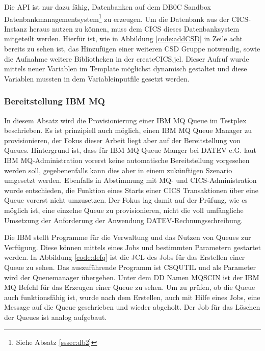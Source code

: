 Die API ist nur dazu fähig, Datenbanken auf dem DB0C Sandbox Datenbankmanagementsystem\footnote{Siehe Absatz \ref{sssec:db2}} zu erzeugen.
Um die Datenbank aus der CICS-Instanz heraus nutzen zu können, muss dem CICS dieses Datenbanksystem mitgeteilt werden.
Hierfür ist, wie in Abbildung \ref{code:addCSD} in Zeile acht bereits zu sehen ist, das Hinzufügen einer weiteren CSD Gruppe notwendig, sowie die Aufnahme weitere Bibliotheken in der \glqq createCICS.jcl\grqq.
Dieser Aufruf wurde mittels neuer Variablen im Template möglichst dynamisch gestaltet und diese Variablen mussten in dem Variableinputfile gesetzt werden.

\subsubsection{Bereitstellung IBM MQ}\label{sssec:mqtplx}
In diesem Absatz wird die Provisionierung einer IBM MQ Queue im Testplex beschrieben. 
Es ist prinzipiell auch möglich, einen IBM MQ Queue Manager zu provisionieren, der Fokus dieser Arbeit liegt aber auf der Bereitstellung von Queues. 
Hintergrund ist, dass für  IBM MQ Queue Manger bei DATEV e.G.  laut IBM MQ-Administration vorerst keine automatische Bereitstellung vorgesehen werden soll, gegebenenfalls kann dies aber in einem zukünftigen Szenario umgesetzt werden.
Ebenfalls in Abstimmung mit MQ- und CICS-Administration wurde entschieden, die Funktion eines Starts einer CICS Transaktionen über eine Queue vorerst nicht umzusetzen. Der Fokus lag damit auf der Prüfung, wie es möglich ist, eine einzelne Queue zu provisionieren, nicht die voll umfängliche Umsetzung der Anforderung der Anwendung DATEV-Rechnungsschreibung. 

Die IBM stellt Programme für die Verwaltung und das Nutzen von Queues  zur Verfügung.
Diese können mittels eines Jobs und bestimmten Parametern gestartet werden.
In Abbildung \ref{code:defq} ist die JCL des Jobs für das Erstellen einer Queue zu sehen.
Das auszuführende Programm ist \glqq CSQUTIL\grqq{} und als Parameter wird der Queuemanager übergeben.
Unter dem DD Namen \glqq MQSCIN\grqq{} ist der IBM MQ Befehl für das Erzeugen einer Queue zu sehen.
Um zu prüfen, ob die Queue auch funktionsfähig ist, wurde nach dem Erstellen, auch mit Hilfe eines Jobs, eine Message auf die Queue geschrieben und wieder abgeholt.
Der Job für das Löschen der Queues ist analog aufgebaut.

